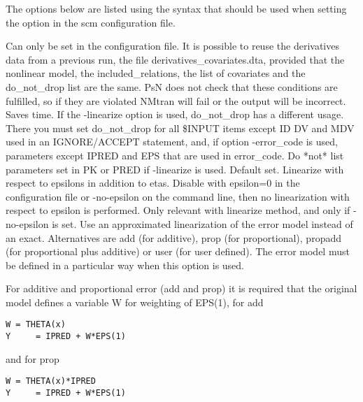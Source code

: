 The options below are listed using the syntax that should be used when setting the option in the scm configuration file.
\begin{optionlist}
Can only be set in the configuration file. It is possible to reuse the derivatives data from a previous run, the file derivatives\_covariates.dta, provided that the nonlinear model, the included\_relations, the list of covariates and the do\_not\_drop list are the same. PsN does not check that these conditions are fulfilled, so if they are violated NMtran will fail or the output will be incorrect. Saves time.
\nextopt
{}
If the -linearize option is used, do\_not\_drop has a different usage. There you must set do\_not\_drop for all \$INPUT items except ID DV and MDV used in an IGNORE/ACCEPT statement, and, if option -error\_code is used, parameters except IPRED and EPS that are used in error\_code. Do *not* list parameters set in PK or PRED if -linearize is used.
\nextopt
{}
Default set. Linearize with respect to epsilons in addition to etas. Disable with epsilon=0 in the configuration file or -no-epsilon on the command line, then no linearization with respect to epsilon is performed. 
\nextopt
{}
Only relevant with linearize method, and only if -no-epsilon is set. Use an approximated linearization of the error model instead of an exact. Alternatives are add (for additive), prop (for proportional), propadd (for proportional plus additive) or user (for user defined). The error model must be defined in a particular way when this option is used.  

For additive and proportional error (add and prop) it is required that the original model defines a variable W for weighting of EPS(1), for add
\begin{verbatim}
W = THETA(x)
Y     = IPRED + W*EPS(1)
\end{verbatim}
and for prop
\begin{verbatim}
W = THETA(x)*IPRED
Y     = IPRED + W*EPS(1)
\end{verbatim}


\end{optionlist}
